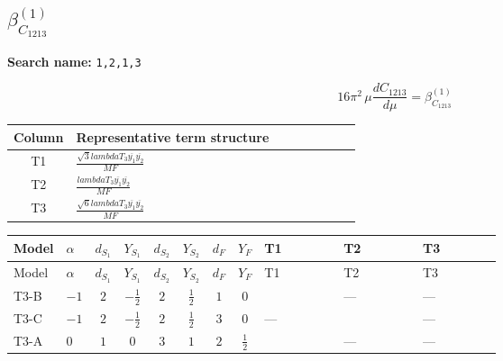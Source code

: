 \documentclass[8pt]{article}
\begin{document}
\begin{landscape}
\section*{$\beta_{C_{1213}}^{(1)}$}
\noindent\textbf{Search name: }\texttt{1,2,1,3}\par\smallskip
\[16\pi^2\,\mu\frac{d C_{1213}}{d\mu}=\beta_{C_{1213}}^{(1)}\]
\begin{center}
\begin{tabular}{@{}c >{\raggedright\arraybackslash}p{0.82\linewidth}@{}}
\toprule
Column & Representative term structure \\
\midrule
T1 & \(\displaystyle \frac{\sqrt{3} lambdaT_{3} \overline{y_{1}} \overline{y_{2}}}{MF}\) \\
\midrule
T2 & \(\displaystyle \frac{lambdaT_{3} \overline{y_{1}} \overline{y_{2}}}{MF}\) \\
\midrule
T3 & \(\displaystyle \frac{\sqrt{6} lambdaT_{3} \overline{y_{1}} \overline{y_{2}}}{MF}\) \\
\midrule
\bottomrule
\end{tabular}
\end{center}
\smallskip
\tiny
\begin{longtable}{@{}llcccccc >{\raggedright\arraybackslash}p{0.21\linewidth} >{\raggedright\arraybackslash}p{0.21\linewidth} >{\raggedright\arraybackslash}p{0.21\linewidth}@{}}
\toprule
Model & $\alpha$ & $d_{S_1}$ & $Y_{S_1}$ & $d_{S_2}$ & $Y_{S_2}$ & $d_F$ & $Y_F$ & T1 & T2 & T3 \\
\midrule
\endfirsthead
\toprule
Model & $\alpha$ & $d_{S_1}$ & $Y_{S_1}$ & $d_{S_2}$ & $Y_{S_2}$ & $d_F$ & $Y_F$ & T1 & T2 & T3 \\
\midrule
\endhead
T3-B & $-1$ & $2$ & $-\frac{1}{2}$ & $2$ & $\frac{1}{2}$ & $1$ & $0$ & \scriptsize\adjustbox{max width=\linewidth}{$\begin{gathered} - \frac{\sqrt{3} lambdaT_{3} \overline{y_{1}} \overline{y_{2}}}{3 MF}\end{gathered}$} & --- & --- \\
\midrule
T3-C & $-1$ & $2$ & $-\frac{1}{2}$ & $2$ & $\frac{1}{2}$ & $3$ & $0$ & --- & \scriptsize\adjustbox{max width=\linewidth}{$\begin{gathered} \frac{lambdaT_{3} \overline{y_{1}} \overline{y_{2}}}{3 MF}\end{gathered}$} & --- \\
\midrule
T3-A & $0$ & $1$ & $0$ & $3$ & $1$ & $2$ & $\frac{1}{2}$ & \scriptsize\adjustbox{max width=\linewidth}{$\begin{gathered} - \frac{\sqrt{3} lambdaT_{3} \overline{y_{1}} \overline{y_{2}}}{3 MF}\end{gathered}$} & --- & --- \\

\end{longtable}
\end{landscape}
\end{document}
